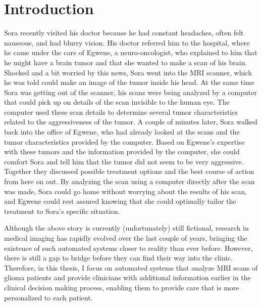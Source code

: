 
\chapter{Introduction}

\begin{ChapterAbstractNoTitle}
Sora recently visited his doctor because he had constant headaches, often felt nauseous, and had blurry vision.
His doctor referred him to the hospital, where he came under the care of Egwene, a neuro-oncologist, who explained to him that he might have a brain \gls{tumor} and that she wanted to make a scan of his brain.
Shocked and a bit worried by this news, Sora went into the MRI scanner, which he was told could make an image of the \gls{tumor} inside his head.
At the same time Sora was getting out of the scanner, his scans were being analyzed by a computer that could pick up on details of the scan invisible to the human eye.
The computer used these scan details to determine several \gls{tumor} characteristics related to the aggressiveness of the \gls{tumor}.
A couple of minutes later, Sora walked back into the office of Egwene, who had already looked at the scans and the \gls{tumor} characteristics provided by the computer.
Based on Egwene's expertise with these \glspl{tumor} and the information provided by the computer, she could comfort Sora and tell him that the \gls{tumor} did not seem to be very aggressive.
Together they discussed possible treatment options and the best course of action from here on out.
By analyzing the scan using a computer directly after the scan was made, Sora could go home without worrying about the results of his scan, and Egwene could rest assured knowing that she could optimally tailor the treatment to Sora's specific situation.
\end{ChapterAbstractNoTitle}

Although the above story is currently (unfortunately) still fictional, research in medical imaging has rapidly evolved over the last couple of years, bringing the existence of such automated systems closer to reality than ever before.
However, there is still a gap to bridge before they can find their way into the clinic.
Therefore, in this thesis, I focus on automated systems that analyze \acrshort{MRI} scans of glioma patients and provide clinicians with additional information earlier in the clinical decision making process, enabling them to provide care that is more personalized to each patient.


